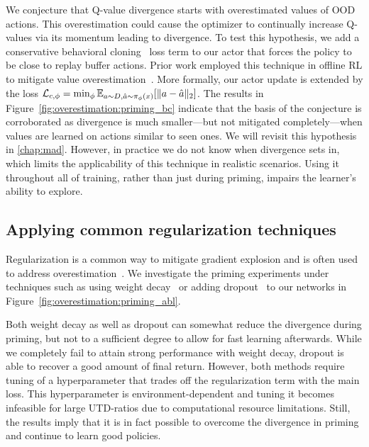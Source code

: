We conjecture that Q-value divergence starts with overestimated values of OOD actions. This overestimation could cause the optimizer to continually increase Q-values via its momentum leading to divergence. 
To test this hypothesis, we add a conservative behavioral cloning~\parencite{pomerleau1988alvinn, atkeson1997robot} loss term to our actor that forces the policy to be close to replay buffer actions. Prior work employed this technique in offline RL to mitigate value overestimation~\parencite{fujimoto2021td3bc}. More formally, our actor update is extended by the loss $
        \mathcal{L}_{c, \phi} = \min_{\phi} \mathbb{E}_{a \sim D, \hat{a} \sim \pi_{\phi}(x)}[\|a - \hat{a}\|_2]$. 
The results in Figure~\ref{fig:overestimation:priming_bc} indicate that the basis of the conjecture is corroborated as divergence is much smaller---but not mitigated completely---when values are learned on actions similar to seen ones.
We will revisit this hypothesis in \autoref{chap:mad}.
However, in practice we do not know when divergence sets in, which limits the applicability of this technique in realistic scenarios. Using it throughout all of training, rather than just during priming, impairs the learner's ability to explore.




\subsection{Applying common regularization techniques} \label{sec:regularization}

Regularization is a common way to mitigate gradient explosion and is  often used to address overestimation~\parencite{farebrother2018generalization, chen2021randomized, liu2021regularization, hiraoka2022dropout, li2023efficient}. We investigate the priming experiments under techniques such as using weight decay~\parencite{krogh1991simple} or adding dropout~\parencite{srivastava14dropout} to our networks in Figure~\ref{fig:overestimation:priming_abl}.

Both weight decay as well as dropout can somewhat reduce the divergence during priming, but not to a sufficient degree to allow for fast learning afterwards.
While we completely fail to attain strong performance with weight decay, dropout is able to recover a good amount of final return.
However, both methods require tuning of a hyperparameter that trades off the regularization term with the main loss.
This hyperparameter is environment-dependent and tuning it becomes infeasible for large UTD-ratios due to computational resource limitations. 
Still, the results imply that it is in fact possible to overcome the divergence in priming and continue to learn good policies.





